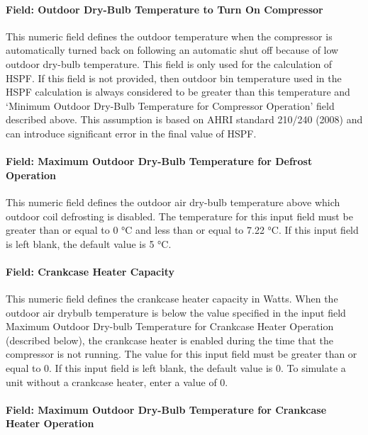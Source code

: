 \paragraph{Field: Outdoor Dry-Bulb Temperature to Turn On Compressor}\label{field-outdoor-dry-bulb-temperature-to-turn-on-compressor-1}

This numeric field defines the outdoor temperature when the compressor is automatically turned back on following an automatic shut off because of low outdoor dry-bulb temperature. This field is only used for the calculation of HSPF. If this field is not provided, then outdoor bin temperature used in the HSPF calculation is always considered to be greater than this temperature and `Minimum Outdoor Dry-Bulb Temperature for Compressor Operation' field described above. This assumption is based on AHRI standard 210/240 (2008) and can introduce significant error in the final value of HSPF.

\paragraph{Field: Maximum Outdoor Dry-Bulb Temperature for Defrost Operation}\label{field-maximum-outdoor-dry-bulb-temperature-for-defrost-operation-2}

This numeric field defines the outdoor air dry-bulb temperature above which outdoor coil defrosting is disabled. The temperature for this input field must be greater than or equal to 0 °C and less than or equal to 7.22 °C. If this input field is left blank, the default value is 5 °C.

\paragraph{Field: Crankcase Heater Capacity}\label{field-crankcase-heater-capacity-6}

This numeric field defines the crankcase heater capacity in Watts. When the outdoor air drybulb temperature is below the value specified in the input field Maximum Outdoor Dry-bulb Temperature for Crankcase Heater Operation (described below), the crankcase heater is enabled during the time that the compressor is not running. The value for this input field must be greater than or equal to 0. If this input field is left blank, the default value is 0. To simulate a unit without a crankcase heater, enter a value of 0.

\paragraph{Field: Maximum Outdoor Dry-Bulb Temperature for Crankcase Heater Operation}\label{field-maximum-outdoor-dry-bulb-temperature-for-crankcase-heater-operation-6}

